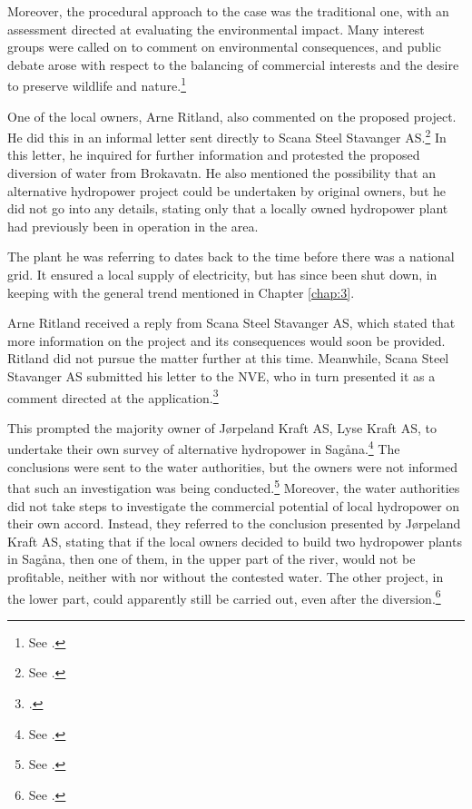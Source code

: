 Moreover, the procedural approach to the case was the traditional one, with an assessment directed at evaluating the environmental impact. Many interest groups were called on to comment on environmental consequences, and public debate arose with respect to the balancing of commercial interests and the desire to preserve wildlife and nature.\footnote{See \cite[19]{jorpeland09}.}

One of the local owners, Arne Ritland, also commented on the proposed project. He did this in an informal letter sent directly to Scana Steel Stavanger AS.\footnote{See \cite[17]{jorpeland09}.} In this letter, he inquired for further information and protested the proposed diversion of water from Brokavatn. He also mentioned the possibility that an alternative hydropower project could be undertaken by original owners, but he did not go into any details, stating only that a locally owned hydropower plant had previously been in operation in the area. 

The plant he was referring to dates back to the time before there was a national grid. It ensured a local supply of electricity, but has since been shut down, in keeping with the general trend mentioned in Chapter \ref{chap:3}.

Arne Ritland received a reply from Scana Steel Stavanger AS, which stated that more information on the project and its consequences would soon be provided. Ritland did not pursue the matter further at this time. Meanwhile, Scana Steel Stavanger AS submitted his letter to the NVE, who in turn presented it as a comment directed at the application.\footnote{\cite[18]{jorpeland09}.}

This prompted the majority owner of Jørpeland Kraft AS, Lyse Kraft AS, to undertake their own survey of alternative hydropower in Sagåna.\footnote{See \cite[19]{jorpeland09}.} The conclusions were sent to the water authorities, but the owners were not informed that such an investigation was being conducted.\footnote{See \cite[23]{jorpeland09}.} Moreover, the water authorities did not take steps to investigate the commercial potential of local hydropower on their own accord. Instead, they referred to the conclusion presented by Jørpeland Kraft AS, stating that if the local owners decided to build two hydropower plants in Sagåna, then one of them, in the upper part of the river, would not be profitable, neither with nor without the contested water. The other project, in the lower part, could apparently still be carried out, even after the diversion.\footnote{See \cite[23]{jorpeland09}.}

